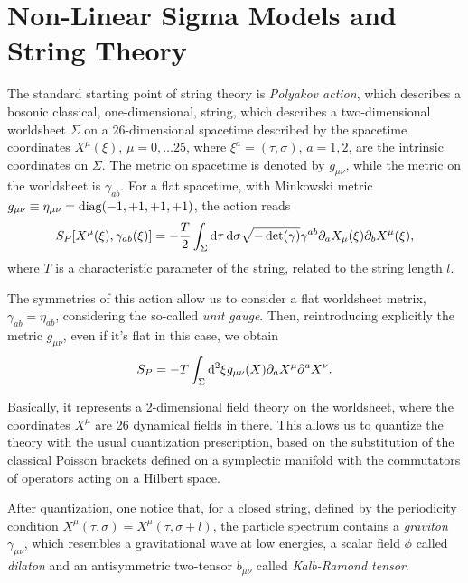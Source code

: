 \section{Non-Linear Sigma Models and String Theory}
The standard starting point of string theory is \emph{Polyakov action}, which describes a bosonic classical, one-dimensional, string, which describes a two-dimensional worldsheet $\Sigma$ on a $26$-dimensional spacetime described by the spacetime coordinates $X^\mu(\xi)$, $\mu = 0, \dots 25$, where $\xi^a = (\tau, \sigma)$, $a = 1,2$, are the intrinsic coordinates on $\Sigma$. The metric on spacetime is denoted by $g_{\mu\nu}$, while the metric on the worldsheet is $\gamma_{ab}$. For a flat spacetime, with Minkowski metric $g_{\mu\nu} \equiv \eta_{\mu\nu} = \textup{diag}(-1,+1,+1,+1)$, the action reads
\begin{equation}\label{eq:polyakov}
    S_P [X^\mu(\xi), \gamma_{ab}(\xi)] = -\frac{T}{2} \int_\Sigma \mathop{}\!\mathrm{d} \tau \mathop{}\!\mathrm{d} \sigma \sqrt{-\det(\gamma)} \gamma^{ab} \partial_a X_\mu (\xi) \partial_b X^\mu (\xi),
\end{equation}
where $T$ is a characteristic parameter of the string, related to the string length $l$.

The symmetries of this action allow us to consider a flat worldsheet metrix, $\gamma_{ab} = \eta_{ab}$, considering the so-called \emph{unit gauge}. Then, reintroducing explicitly the metric $g_{\mu\nu}$, even if it's flat in this case, we obtain
\begin{equation}\label{eq:polyakov-metric}
    S_P = - T \int_\Sigma \mathop{}\!\mathrm{d}^2 \xi g_{\mu\nu}(X) \partial_a X^\mu \partial^a X^\nu.
\end{equation}

Basically, it represents a 2-dimensional field theory on the worldsheet, where the coordinates $X^\mu$ are 26 dynamical fields in there. This allows us to quantize the theory with the usual quantization prescription, based on the substitution of the classical Poisson brackets defined on a symplectic manifold with the commutators of operators acting on a Hilbert space.

After quantization, one notice that, for a closed string, defined by the periodicity condition $X^\mu(\tau,\sigma) = X^\mu (\tau, \sigma + l)$, the particle spectrum contains a \emph{graviton} $\gamma_{\mu\nu}$, which resembles a gravitational wave at low energies, a scalar field $\phi$ called \emph{dilaton} and an antisymmetric two-tensor $b_{\mu\nu}$ called \emph{Kalb-Ramond tensor}.

